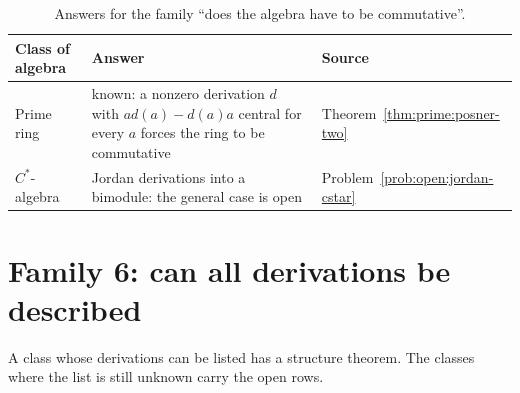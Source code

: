 \begin{table}[htbp]
  \centering
  \caption{Answers for the family ``does the algebra have to be
  commutative''.} %
  \label{tab:q:commutative}
  \begin{tabular}{p{}p{}p{}}
    \toprule
    Class of algebra & Answer & Source \\ %
    \midrule
    Prime ring & known: a nonzero derivation $d$ with $ad(a)-d(a)a$ central %
      for every $a$ forces the ring to be commutative & %
      Theorem~\ref{thm:prime:posner-two} \\ %
    $C^{*}$-algebra & Jordan derivations into a bimodule: the general case is %
      open & Problem~\ref{prob:open:jordan-cstar} \\ %
    \bottomrule
  \end{tabular}
\end{table}

\section{Family 6: can all derivations be described}

A class whose derivations can be listed has a structure theorem. %
The classes where the list is still unknown carry the open rows. %


